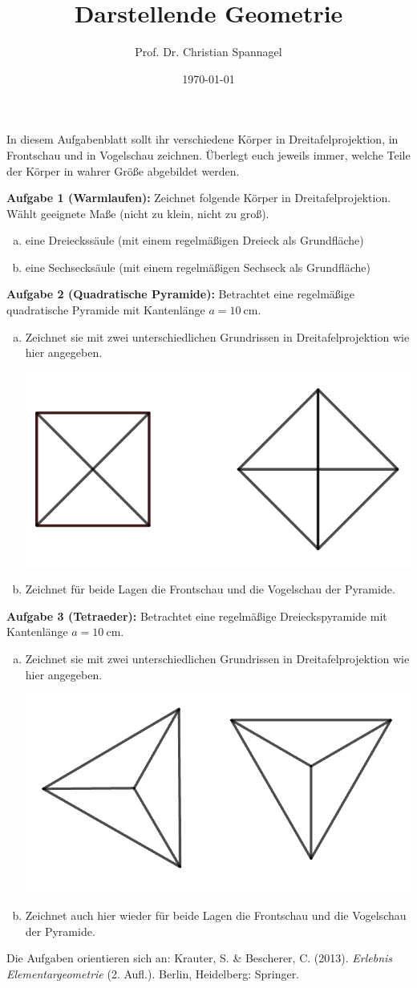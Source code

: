 \documentclass{../cssheet}
\title{Darstellende Geometrie}
\author{Prof. Dr. Christian Spannagel}
\date{\today}
\begin{document}
\printtitle

In diesem Aufgabenblatt sollt ihr verschiedene Körper in Dreitafelprojektion, in Frontschau und in Vogelschau zeichnen. Überlegt euch jeweils immer, welche Teile der Körper in wahrer Größe abgebildet werden.


\textbf{Aufgabe 1 (Warmlaufen):}  Zeichnet folgende Körper in Dreitafelprojektion. Wählt geeignete Maße (nicht zu klein, nicht zu groß).
\begin{enumerate}[a)]
\item eine Dreieckssäule (mit einem regelmäßigen Dreieck als Grundfläche)
\item eine Sechsecksäule (mit einem regelmäßigen Sechseck als Grundfläche)
\end{enumerate}

\textbf{Aufgabe 2 (Quadratische Pyramide):}  Betrachtet eine regelmäßige quadratische Pyramide mit Kantenlänge $a=\SI{10}{\cm}$.
\begin{enumerate}[a)]
\item Zeichnet sie mit zwei unterschiedlichen Grundrissen in Dreitafelprojektion wie hier angegeben.
\begin{center}
\includegraphics[width=6 cm]{quad-pyramide.png}
\end{center}
\item Zeichnet für beide Lagen die Frontschau und die Vogelschau der Pyramide. 
\end{enumerate}

\textbf{Aufgabe 3 (Tetraeder):}  Betrachtet eine regelmäßige Dreieckspyramide mit Kantenlänge $a=\SI{10}{\cm}$.
\begin{enumerate}[a)]
\item Zeichnet sie mit zwei unterschiedlichen Grundrissen in Dreitafelprojektion wie hier angegeben.
\begin{center}
\includegraphics[width=6 cm]{tetraeder.png}
\end{center}
\item Zeichnet auch hier wieder für beide Lagen die Frontschau und die Vogelschau der Pyramide. 

\end{enumerate}

Die Aufgaben orientieren sich an: Krauter, S. \& Bescherer, C. (2013). \emph{Erlebnis Elementargeometrie} (2. Aufl.). Berlin, Heidelberg: Springer.

\printlicense

\printsocials
\end{document}
